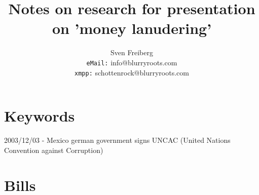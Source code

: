 \documentclass{article}
\begin{document}
\title{Notes on research for presentation on 'money lanudering'}
\author{Sven Freiberg\\
\texttt{eMail:} info@blurryroots.com\\
\texttt{xmpp:} schottenrock@blurryroots.com}
\maketitle

\tableofcontents
\newpage

\part[Keywords]{Keywords}
2003/12/03 - Mexico german government signs UNCAC (United Nations Convention against Corruption)


\part[Bills]{Bills}
\end{document}

